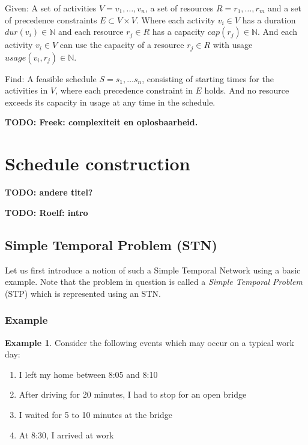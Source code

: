\documentclass{article}
\theoremstyle{definition}
\newcommand{\TODO}[1]{{\color{red}\textbf{TODO: #1}}}
\newtheorem{example}{Example}[section]
\newcommand{\capa}[1]{\ensuremath{cap(r_{#1})}} %
\newcommand{\dur}[1]{\ensuremath{dur(v_{#1})}} %
\newcommand{\usage}[2]{\ensuremath{usage(v_{#1}, r_{#2})}} %
\newenvironment{definition}[1][Definition]{\begin{trivlist}
\item[\hskip \labelsep {\bfseries #1}]}{\end{trivlist}}
\begin{document}
\begin{definition}
Given:
A set of activities $V = v_1, \ldots, v_n$, a set of resources $R = r_1, \ldots, r_m$ and a set of precedence constraints $E \subset V \times V$.
Where each activity $v_i \in V$ has a duration $\dur{i} \in \mathbb{N}$ and each resource $r_j \in R$ has a capacity $\capa{j} \in \mathbb{N}$. 
And each activity $v_i \in V$ can use the capacity of a resource $r_j \in R$ with usage $\usage{i}{j} \in \mathbb{N}$.

Find:
A feasible schedule $S = s_1, \ldots s_n$, consisting of starting times for the activities in $V$, where each precedence constraint in $E$ holds.
And no resource exceeds its capacity in usage at any time in the schedule.
\end{definition}


\TODO{Freek: complexiteit en oplosbaarheid.}


\newpage


\section{Schedule construction} \TODO{andere titel?}

\TODO{Roelf: intro}

\subsection{Simple Temporal Problem (STN)}
Let us first introduce a notion of such a Simple Temporal Network using a basic example. 
Note that the problem in question is called a \emph{Simple Temporal Problem} (STP) which is represented using an STN.

\subsubsection{Example}
\begin{example}
\label{exmp:stn}
Consider the following events which may occur on a typical work day:
\begin{enumerate}
\item I left my home between 8:05 and 8:10
\item After driving for 20 minutes, I had to stop for an open bridge
\item I waited for 5 to 10 minutes at the bridge
\item At 8:30, I arrived at work 
\end{enumerate}
\end{example}
\end{document}
